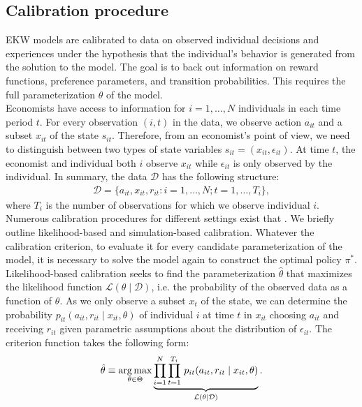\subsection{Calibration procedure}
EKW models are calibrated to data on observed individual decisions and experiences under the hypothesis that the individual's behavior is generated from the solution to the model. The goal is to back out information on reward functions, preference parameters, and transition probabilities. This requires the full parameterization $\theta$ of the model.\\

\noindent Economists have access to information for $i = 1, \hdots, N$ individuals in each time period $t$. For every observation $(i, t)$ in the data, we observe action $a_{it}$ and a subset $x_{it}$ of the state $s_{it}$. Therefore, from an economist's point of view, we need to distinguish between two types of state variables $s_{it} = (x_{it}, \epsilon_{it})$. At time $t$, the economist and individual both $i$ observe $x_{it}$ while $\epsilon_{it}$ is only observed by the individual. In summary, the data $\mathcal{D}$ has the following structure:
%
\begin{align*}
  \mathcal{D} = \{a_{it}, x_{it}, r_{it}: i = 1, \hdots, N; t = 1, \hdots, T_i\},
\end{align*}
where $T_i$ is the number of observations for which we observe individual $i$.\\

\noindent Numerous calibration procedures for different settings exist that \citep{Davidson.2003, Gourieroux.1996}. We briefly outline likelihood-based and simulation-based calibration. Whatever the calibration criterion, to evaluate it for every candidate parameterization of the model, it is necessary to solve the model again to construct the optimal policy $\pi^*$.\\

\noindent Likelihood-based calibration seeks to find the parameterization $\hat{\theta}$ that maximizes the likelihood function $\mathcal{L}(\theta\mid\mathcal{D})$, i.e. the probability of the observed data as a function of $\theta$. As we only observe a subset $x_t$ of the state, we can determine the probability $p_{it}(a_{it}, r_{it} \mid x_{it}, \theta)$ of individual $i$ at time $t$ in $x_{it}$ choosing $a_{it}$ and receiving $r_{it}$ given parametric assumptions about the distribution of $\epsilon_{it}$. The criterion function takes the following form:
%
\begin{align*}
  \hat{\theta} \equiv \operatorname*{arg\,max}_{\theta \in \Theta}  \underbrace{\prod^N_{i= 1} \prod^{T_i}_{t= 1}\, p_{it}(a_{it}, r_{it} \mid x_{it}, \theta)}_{\mathcal{L}(\theta\mid\mathcal{D})}.
\end{align*}

